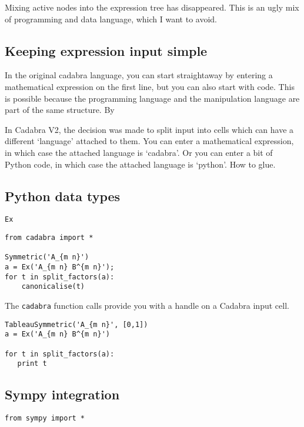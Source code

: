 \documentclass[11pt]{article}
\begin{document}
Mixing active nodes into the expression tree has disappeared. This is
an ugly mix of programming and data language, which I want to avoid.


\subsection{Keeping expression input simple}

In the original cadabra language, you can start straightaway by
entering a mathematical expression on the first line, but you can also
start with code.  This is possible because the programming language
and the manipulation language are part of the same structure. By

In Cadabra V2, the decision was made to split input into cells which
can have a different `language' attached to them. You can enter a
mathematical expression, in which case the attached language is
`cadabra'. Or you can enter a bit of Python code, in which case the
attached language is `python'. How to glue.

\subsection{Python data types}

\begin{description}
\item[{\tt Ex}] 
\end{description}


\begin{lstlisting}
from cadabra import *

Symmetric('A_{m n}')
a = Ex('A_{m n} B^{m n}');
for t in split_factors(a):
    canonicalise(t)
\end{lstlisting}

The {\tt cadabra} function calls provide you with a handle on a
Cadabra input cell.

\begin{lstlisting}
TableauSymmetric('A_{m n}', [0,1])
a = Ex('A_{m n} B^{m n}')

for t in split_factors(a):
   print t   
\end{lstlisting}


\subsection{Sympy integration}

\begin{lstlisting}
from sympy import *
\end{lstlisting}
\end{document}
